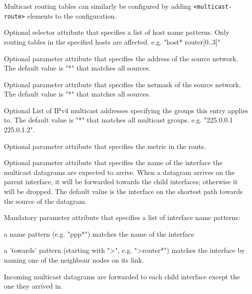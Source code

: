 Multicast routing tables can similarly be configured by adding
\verb!<multicast-route>! elements to the configuration.
\begin{compactitem}
    \item {}
      Optional selector attribute that specifies a list of host name patterns.
      Only routing tables in the specified hosts are affected.
      e.g. "host* router[0..3]"

    \item {}
      Optional parameter attribute that specifies the address of the source
      network. The default value is "*" that matches all sources.

    \item {}
      Optional parameter attribute that specifies the netmask of the source
      network. The default value is "*" that matches all sources.

    \item {}
      Optional List of IPv4 multicast addresses specifying the groups this entry
      applies to. The default value is "*" that matches all multicast groups.
      e.g. "225.0.0.1 225.0.1.2".

    \item {}
      Optional parameter attribute that specifies the metric in the route.

    \item {}
      Optional parameter attribute that specifies the name of the interface
      the multicast datagrams are expected to arrive. When a datagram arrives
      on the parent interface, it will be forwarded towards the child interfaces;
      otherwise it will be dropped. The default value is the interface on the
      shortest path towards the source of the datagram.

    \item {}
      Mandatory parameter attribute that specifies a list of interface name
      patterns:
      \begin{compactitem}
        \item a name pattern (e.g. "ppp*") matches the name of the interface
        \item a 'towards' pattern (starting with ">", e.g. ">router*") matches the interface
         by naming one of the neighbour nodes on its link.
      \end{compactitem}
      Incoming multicast datagrams are forwarded to each child interface except the
      one they arrived in.
\end{compactitem}

